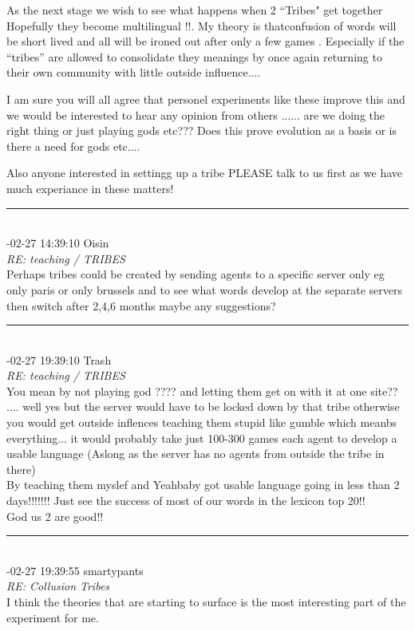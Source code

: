 \begin{mail}
As the next stage we wish to see what happens when 2 ``Tribes" get together Hopefully they become multilingual !!.
My theory is thatconfusion of words will be short lived and all will be ironed out after only a few games . Especially if the ``tribes'' are allowed to consolidate they meanings by once again returning to their own community with little outside  influence....

I am sure you will all agree that personel experiments like these improve this and we would be interested to hear any opinion from others ...... are we doing the right thing or just playing gods etc???
 Does this prove evolution as a basis or is there a need for gods etc.... 

Also anyone interested in settingg up a tribe PLEASE talk to us first as we have much experiance in these matters!\\
\rule{0.8\textwidth}{.4pt}\\
{-02-27 14:39:10 Oisin}\\
{\itshape RE: teaching / TRIBES}\\
Perhaps tribes could be created by sending agents to a specific server only eg only paris or only brussels and to see what words develop at the separate servers then switch after 2,4,6 months maybe any suggestions?\\
\rule{0.8\textwidth}{.4pt}\\
{-02-27 19:39:10 Trash}\\
{\itshape RE: teaching / TRIBES}\\
You mean by not playing god ???? and letting them get on with it at one site?? .... well yes but the server would have to be locked down by that tribe otherwise you would get outside inflences teaching them stupid like gumble which meanbs everything... it would probably take just 100-300 games each agent to develop a usable language (Aslong as the server has no agents from outside the  tribe in there)\\
By teaching them myslef and Yeahbaby got usable language going in  less than 2 days!!!!!!! Just see the success of most of our words in the lexicon top 20!!\\
God us 2 are good!!\\
\rule{0.8\textwidth}{.4pt}\\
{-02-27 19:39:55 smartypants}\\
{\itshape RE: Collusion Tribes}\\
I think the theories that are starting to surface is the most interesting part of the experiment for me. 

\end{mail}
